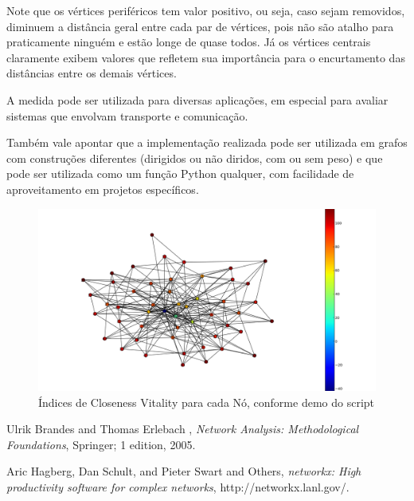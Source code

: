 \documentclass{article}
\begin{document}
Note que os vértices periféricos tem valor positivo, ou seja, caso sejam removidos, diminuem a distância geral entre cada par de vértices, pois não são atalho para praticamente ninguém e estão longe de quase todos. Já os vértices centrais claramente exibem valores que refletem sua importância para o encurtamento das distâncias entre os demais vértices.

A medida pode ser utilizada para diversas aplicações, em especial para avaliar sistemas que envolvam transporte e comunicação.

Também vale apontar que a implementação realizada pode ser utilizada em grafos com construções diferentes (dirigidos ou não diridos, com ou sem peso) e que pode ser utilizada como um função Python qualquer, com facilidade de aproveitamento em projetos específicos.


\begin{figure}
    \centering
    \includegraphics[width=6.0in]{rede-plotada}
    \caption{Índices de Closeness Vitality para cada Nó, conforme demo do script}
    \label{simulationfigure}
\end{figure}


\begin{thebibliography}

Ulrik Brandes and Thomas Erlebach , \textsl{Network Analysis: Methodological Foundations},
Springer; 1 edition, 2005.

Aric Hagberg, Dan Schult, and Pieter Swart and Others, \textsl{networkx: High productivity software for complex networks},
http://networkx.lanl.gov/.



\end{thebibliography}
\end{document}
